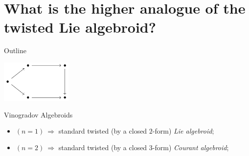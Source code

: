 \documentclass[10pt]{beamer}
\renewcommand{\checkpoint}[0]{
	\setcounter{tocdepth}{1}
	\addtocounter{framenumber}{-1}
 	\begin{frame}[t]{Outline}
  		\tableofcontents[currentsection]
		\begin{center}
			\includegraphics[width=3.5cm]{Pictures/Figure_pentagondiagm_page}
		\end{center}
	\end{frame}
}
\begin{document}
\section{What is the \textbf{higher analogue} of the \textbf{twisted Lie algebroid}?}
\checkpoint	

\begin{frame}[t]{Vinogradov Algebroids}
	\begin{defblock}
				
	\end{defblock}
	\vfill
	\begin{itemize}
		\item<6-> $(n=1) ~ \Rightarrow$ standard twisted {\small \color{UniGreen} (by a closed $2$-form)}  \emph{Lie algebroid};
		\item<7-> $(n=2) ~ \Rightarrow$ standard twisted {\small \color{UniGreen} (by a closed $3$-form)} \emph{Courant algebroid};
	\end{itemize}

\end{frame}
\end{document}
